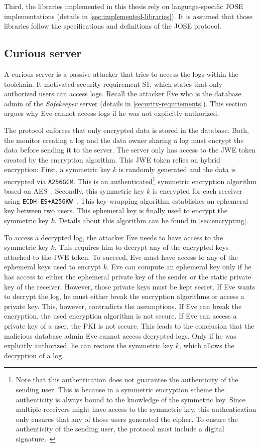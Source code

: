 \documentclass[../main.tex]{subfiles}
\begin{document}
Third, the libraries implemented in this thesis rely on language-specific JOSE implementations (details in \cref{sec:implemented-libraries}).
It is assumed that those libraries follow the specifications and definitions of the JOSE protocol.

\subsection{Curious server}
A curious server is a passive attacker that tries to access the logs within the toolchain.
It motivated security requirement S1, which states that only authorized users can access logs.
Recall the attacker Eve who is the database admin of the \emph{Safekeeper} server (details in \cref{security-requriements}).
This section argues why Eve cannot access logs if he was not explicitly authorized.

The protocol enforces that only encrypted data is stored in the database.
Both, the monitor creating a log and the data owner sharing a log must encrypt the data before sending it to the server.
The server only has access to the JWE token created by the encryption algorithm.
This JWE token relies on hybrid encryption:
First, a symmetric key $k$ is randomly generated and the data is encrypted via \verb|A256GCM|.
This is an authenticated\footnote{Note that this authentication does not guarantee the authenticity of the sending user. This is because in a symmetric encryption scheme the authenticity is always bound to the knowledge of the symmetric key. Since multiple receivers might have access to the symmetric key, this authentication only ensures that any of those users generated the cipher. To ensure the authenticity of the sending user, the protocol must include a digital signature.~\cite[315]{Eckert2018}} symmetric encryption algorithm based on AES~\cite{JWA2015}.
Secondly, this symmetric key $k$ is encrypted for each receiver using \verb|ECDH-ES+A256KW|~\cite{JWA2015}.
This key-wrapping algorithm establishes an ephemeral key between two users.
This ephemeral key is finally used to encrypt the symmetric key $k$.
Details about this algorithm can be found in \cref{sec:encrypting}.

To access a decrypted log, the attacker Eve needs to have access to the symmetric key $k$.
This requires him to decrypt any of the encrypted keys attached to the JWE token.
To succeed, Eve must have access to any of the ephemeral keys used to encrypt $k$.
Eve can compute an ephemeral key only if he has access to either the ephemeral private key of the sender or the static private key of the receiver.
However, those private keys must be kept secret.
If Eve wants to decrypt the log, he must either break the encryption algorithms or access a private key.
This, however, contradicts the assumptions.
If Eve can break the encryption, the used encryption algorithm is not secure.
If Eve can access a private key of a user, the PKI is not secure.
This leads to the conclusion that the malicious database admin Eve cannot access decrypted logs.
Only if he was explicitly authorized, he can restore the symmetric key $k$, which allows the decryption of a log.
\end{document}
